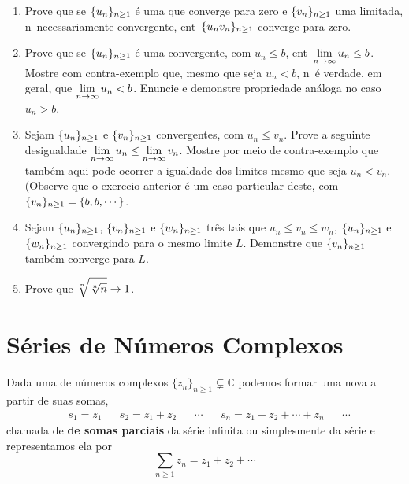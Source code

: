 \begin{enumerate}[label=(\arabic*)]
\item Prove que se $\displaystyle{\{u_n\}_{n\geq1}}$ \'e uma \seq que converge
    para zero e $\displaystyle{\{v_n\}_{n\geq1}}$ uma \seq limitada, n\ao\  necessariamente convergente,
     ent\ao\ $\displaystyle{\{u_n v_n\}_{n\geq1}}$ converge para zero.

\item  Prove que se $\displaystyle{\{u_n\}_{n\geq1}}$ \'e uma \seq convergente, com $u_n
\leq b$, ent\ao\ $\displaystyle{\lim_{n\to\infty} u_n \leq b}$. Mostre com
contra-exemplo que, mesmo que seja $u_n < b$, n\ao\  \'e verdade,
em geral, que $\displaystyle{\lim_{n\to\infty} u_n < b}$. Enuncie e
demonstre propriedade an\'aloga no caso $u_n > b$.

\item  Sejam $\displaystyle{\{u_n\}_{n\geq1}}$ e $\displaystyle{\{v_n\}_{n\geq1}}$  \seqs convergentes, com $u_n
\leq v_n$. Prove  a seguinte desigualdade $\displaystyle{\lim_{n\to\infty}
u_n \leq \lim_{n\to\infty} v_n}$. Mostre por meio de
contra-exemplo que tamb\'em aqui pode ocorrer a igualdade dos
limites mesmo que seja $u_n < v_n$. (Observe que o exerc\ii cio
anterior \'e um caso particular deste, com \seq
$\displaystyle{\{v_n\}_{n\geq1} = \{b, b, \cdots\}}$.

\item Sejam $\displaystyle{\{u_n\}_{n\geq1}}$, $\displaystyle{\{v_n\}_{n\geq1}}$ e $\displaystyle{\{w_n\}_{n\geq1}}$ tr\^es
\seqs tais que $u_n\leq v_n \leq w_n$, $\displaystyle{\{u_n\}_{n\geq1}}$ e
$\displaystyle{\{w_n\}_{n\geq1}}$ convergindo para o mesmo limite $L$.
Demonstre que $\displaystyle{\{v_n\}_{n\geq1}}$ tamb\'em converge para $L$.

\item Prove que $\displaystyle{\sqrt[n]{\sqrt[n]{n}}\to 1}$.
\end{enumerate}

\section{S\'{e}ries de N\'{u}meros Complexos}

Dada uma \seq de n\'umeros complexos $\{z_n\}_{n\geq 1}\subsetneq
\mathbb{C}$ podemos formar uma nova \seq a partir de suas somas,
\begin{align*}
&  s_1 =z_1 && s_2 =z_1+z_2 &&\cdots
&& s_n=z_1+z_2+\cdots+z_n && \cdots
\end{align*}
chamada de \textbf{\seq de somas parciais} da s\'erie infinita ou
simplesmente da s\'erie e representamos ela por
\begin{equation}\label{ser1}
  \sum_{n\geq 1}z_n=z_1+z_2+\cdots
\end{equation}

